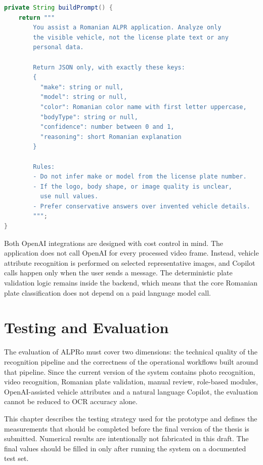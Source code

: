 ﻿\documentclass[12pt,a4paper]{article}
\begin{document}
\begin{lstlisting}[language=Java, caption={Prompt used for vehicle attribute recognition}, label={lst:vehicle-prompt}]
private String buildPrompt() {
    return """
        You assist a Romanian ALPR application. Analyze only
        the visible vehicle, not the license plate text or any
        personal data.

        Return JSON only, with exactly these keys:
        {
          "make": string or null,
          "model": string or null,
          "color": Romanian color name with first letter uppercase,
          "bodyType": string or null,
          "confidence": number between 0 and 1,
          "reasoning": short Romanian explanation
        }

        Rules:
        - Do not infer make or model from the license plate number.
        - If the logo, body shape, or image quality is unclear,
          use null values.
        - Prefer conservative answers over invented vehicle details.
        """;
}
\end{lstlisting}

Both OpenAI integrations are designed with cost control in mind. The application does not call OpenAI for every processed video frame. Instead, vehicle attribute recognition is performed on selected representative images, and Copilot calls happen only when the user sends a message. The deterministic plate validation logic remains inside the backend, which means that the core Romanian plate classification does not depend on a paid language model call.



\newpage



\section{Testing and Evaluation}

The evaluation of ALPRo must cover two dimensions: the technical quality of the recognition pipeline and the correctness of the operational workflows built around that pipeline. Since the current version of the system contains photo recognition, video recognition, Romanian plate validation, manual review, role-based modules, OpenAI-assisted vehicle attributes and a natural language Copilot, the evaluation cannot be reduced to OCR accuracy alone.

This chapter describes the testing strategy used for the prototype and defines the measurements that should be completed before the final version of the thesis is submitted. Numerical results are intentionally not fabricated in this draft. The final values should be filled in only after running the system on a documented test set.
\end{document}
